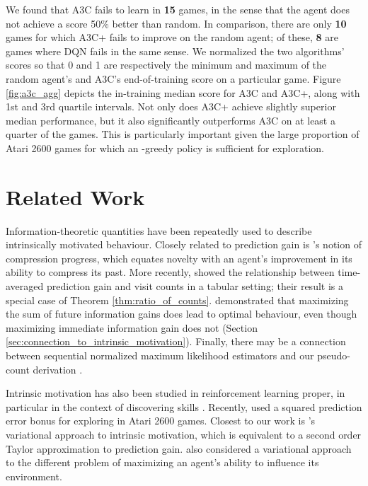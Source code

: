 \documentclass{article}
\begin{document}
We found that A3C fails to learn in \textbf{15} games, in the sense
that the agent does not achieve a score 50\% better than random. In comparison, there
are only \textbf{10} games for which A3C+ fails to improve on the random agent; of these, 
\textbf{8} are games where DQN fails in the same sense. We normalized the two algorithms' 
scores so that 0 and 1 are respectively the minimum and maximum of the random agent's and A3C's
end-of-training score on a particular game. Figure \ref{fig:a3c_agg} depicts the in-training median score for A3C and A3C+, along with 1st and 3rd quartile intervals. Not only does A3C+ achieve
slightly superior median performance, but it also significantly outperforms A3C on at least a
quarter of the games.  This is particularly important given the large proportion of Atari 2600
games for which an -greedy policy is sufficient for exploration. 

\begin{figure*}
\caption{Median and interquartile performance across 60 Atari 2600 games for A3C and A3C+.
\label{fig:a3c_agg}} 
\end{figure*}

\section{Related Work}

Information-theoretic quantities have been repeatedly used to describe intrinsically motivated behaviour. Closely related to prediction gain is \citet{schmidhuber91possibility}'s notion of compression progress, which equates novelty with an agent's improvement in its ability to compress its past.
More recently, \citet{lopes12exploration} showed the relationship between time-averaged prediction gain and visit counts in a tabular setting; their result is a special case of Theorem \ref{thm:ratio_of_counts}. \citet{orseau13universal} demonstrated that maximizing the sum of future information gains does lead to optimal behaviour, even though maximizing immediate information gain does not (Section \ref{sec:connection_to_intrinsic_motivation}). Finally, there may be a connection between sequential normalized maximum likelihood estimators and our pseudo-count derivation \citep[see e.g.][]{ollivier15laplace}.

Intrinsic motivation has also been studied in reinforcement learning proper, in particular in the context of discovering skills \citep{singh04intrinsically,barto13intrinsic}. Recently, \citet{stadie15incentivizing} used a squared prediction error bonus for exploring in Atari 2600 games. Closest to our work is \citet{houthooft16curiosity}'s variational approach to intrinsic motivation, which is equivalent to a second order Taylor approximation to prediction gain.
\citet{mohamed15variational} also considered a variational approach to the different problem of maximizing an agent's ability to influence its environment.
\end{document}
